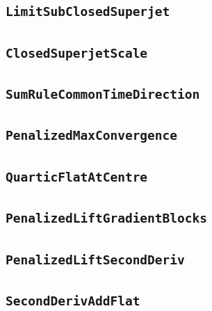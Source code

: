 \documentclass[11pt]{amsart}
\theoremstyle{definition}
\begin{document}
\subsection{\texorpdfstring{\texttt{LimitSubClosedSuperjet}}{LimitSubClosedSuperjet}}\label{node:LimitSubClosedSuperjet}


\subsection{\texorpdfstring{\texttt{ClosedSuperjetScale}}{ClosedSuperjetScale}}\label{node:ClosedSuperjetScale}


\subsection{\texorpdfstring{\texttt{SumRuleCommonTimeDirection}}{SumRuleCommonTimeDirection}}\label{node:SumRuleCommonTimeDirection}


\subsection{\texorpdfstring{\texttt{PenalizedMaxConvergence}}{PenalizedMaxConvergence}}\label{node:PenalizedMaxConvergence}


\subsection{\texorpdfstring{\texttt{QuarticFlatAtCentre}}{QuarticFlatAtCentre}}\label{node:QuarticFlatAtCentre}


\subsection{\texorpdfstring{\texttt{PenalizedLiftGradientBlocks}}{PenalizedLiftGradientBlocks}}\label{node:PenalizedLiftGradientBlocks}


\subsection{\texorpdfstring{\texttt{PenalizedLiftSecondDeriv}}{PenalizedLiftSecondDeriv}}\label{node:PenalizedLiftSecondDeriv}


\subsection{\texorpdfstring{\texttt{SecondDerivAddFlat}}{SecondDerivAddFlat}}\label{node:SecondDerivAddFlat}

\end{document}
